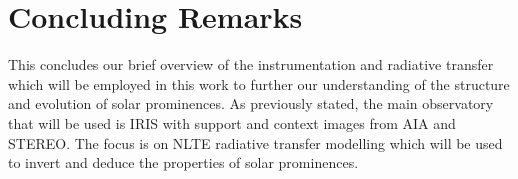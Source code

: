 \section{Concluding Remarks}
This concludes our brief overview of the instrumentation and radiative transfer which will be employed in this work to further our understanding of the structure and evolution of solar prominences. As previously stated, the main observatory that will be used is IRIS with support and context images from AIA and STEREO. The focus is on NLTE \mgiihk{} radiative transfer modelling which will be used to invert and deduce the properties of solar prominences. 